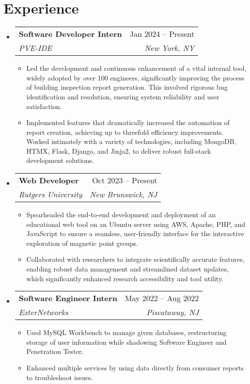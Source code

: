 \documentclass[letterpaper,12pt]{article}
\makeatletter
\newcommand{\resumeItem}[1]{
  \item\small{
    {#1 \vspace{-2pt}}
  }
}
\newcommand{\resumeSubheading}[4]{
  \vspace{-2pt}\item
    \begin{tabular*}{0.97\textwidth}[t]{l@{\extracolsep{\fill}}r}
      \textbf{#1} & #2 \\
      \textit{\small#3} & \textit{\small #4} \\
    \end{tabular*}\vspace{-7pt}
}
\newcommand{\resumeSubHeadingListStart}{\begin{itemize}[leftmargin=0.15in, label={}]}
\newcommand{\resumeSubHeadingListEnd}{\end{itemize}}
\newcommand{\resumeItemListStart}{\begin{itemize}}
\newcommand{\resumeItemListEnd}{\end{itemize}\vspace{-5pt}}
\makeatother
\begin{document}
\section{Experience}
  \resumeSubHeadingListStart
\resumeSubheading
      {Software Developer Intern}{Jan 2024 -- Present}
      {PVE-IDE}{New York, NY}
      \resumeItemListStart
        \resumeItem{Led the development and continuous enhancement of a vital internal tool, widely adopted by over 100 engineers, significantly improving the process of building inspection report generation. This involved rigorous bug identification and resolution, ensuring system reliability and user satisfaction.}
        \resumeItem{Implemented features that dramatically increased the automation of report creation, achieving up to threefold efficiency improvements. Worked intimately with a variety of technologies, including MongoDB, HTMX, Flask, Django, and Jinja2, to deliver robust full-stack development solutions.}
      \resumeItemListEnd
    \resumeSubheading
      {Web Developer}{Oct 2023 -- Present}
      {Rutgers University}{New Brunswick, NJ}
      \resumeItemListStart
        \resumeItem{Spearheaded the end-to-end development and deployment of an educational web tool on an Ubuntu server using AWS, Apache, PHP, and JavaScript to ensure a seamless, user-friendly interface for the interactive exploration of magnetic point groups.}
        \resumeItem{Collaborated with researchers to integrate scientifically accurate features, enabling robust data management and streamlined dataset updates, which significantly enhanced research accessibility and tool utility.}
      \resumeItemListEnd
      \resumeSubheading
      {Software Engineer Intern}{May 2022 -- Aug 2022}
      {ExterNetworks}{Piscataway, NJ}
      \resumeItemListStart
        \resumeItem{Used MySQL Workbench to manage given databases, restructuring storage of user information while shadowing Software Engineer and Penetration Tester.}
        \resumeItem{Enhanced multiple services by using data directly from consumer reports to troubleshoot issues.}
      \resumeItemListEnd
  \resumeSubHeadingListEnd
\end{document}
